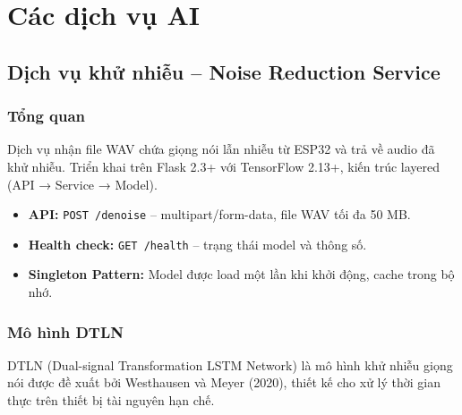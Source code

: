 \chapter{Các dịch vụ AI}

\section{Dịch vụ khử nhiễu -- Noise Reduction Service}

\subsection{Tổng quan}

Dịch vụ nhận file WAV chứa giọng nói lẫn nhiễu từ ESP32 và trả về audio đã khử nhiễu.
Triển khai trên Flask 2.3+ với TensorFlow 2.13+, kiến trúc layered (API → Service → Model).

\begin{itemize}
\item \textbf{API:} \texttt{POST /denoise} -- multipart/form-data, file WAV tối đa 50 MB.
\item \textbf{Health check:} \texttt{GET /health} -- trạng thái model và thông số.
\item \textbf{Singleton Pattern:} Model được load một lần khi khởi động, cache trong bộ nhớ.
\end{itemize}

\subsection{Mô hình DTLN}

DTLN (Dual-signal Transformation LSTM Network) là mô hình khử nhiễu giọng nói
được đề xuất bởi Westhausen và Meyer (2020), thiết kế cho xử lý thời gian thực
trên thiết bị tài nguyên hạn chế.

